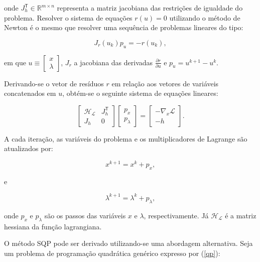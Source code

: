 \documentclass[
	12pt,				%
	openany,			%
	twoside,			%
	a4paper,			%
	chapter=TITLE,		%
	section=Title,		%
	subsection=Title,	%
	subsubsection=Title,%
	english,			%
	french,				%
	spanish,			%
	brazil			%
	]{abntex2}
\begin{document}
\begin{ERRATA}
\noindent onde $J_h^\mathsf{T} \in \mathbb{R}^{m \times n}$ representa a matriz jacobiana das restrições de igualdade do problema. Resolver o sistema de equações $r(u) = 0$ utilizando o método de Newton é o mesmo que resolver uma sequência de problemas lineares do tipo:

\begin{equation}
J_r(u_k)p_u = - r(u_k),
\end{equation}

\noindent em que $u \equiv \begin{bmatrix} x\\ \lambda \end{bmatrix}$, $J_r$ a jacobiana das derivadas $\frac{\partial r}{\partial u}$ e $p_u = u^{k+1}-u^k$.

Derivando-se o vetor de resíduos $r$ em relação aos vetores de variáveis concatenados em $u$, obtém-se o seguinte sistema de equações lineares:

\begin{equation}
\begin{bmatrix}\label{prim}
\mathcal{H_L} & J_h^\mathsf{T} \\
J_h & 0
\end{bmatrix}
\begin{bmatrix}
p_x \\
p_\lambda
\end{bmatrix}
= \begin{bmatrix}
- \nabla_x \mathcal{L} \\
- h
\end{bmatrix}.
\end{equation}

A cada iteração, as variáveis do problema e os multiplicadores de Lagrange são atualizados por:

\begin{equation}
x^{k+1} = x^k + p_x,
\end{equation}

\noindent e


\begin{equation}
\lambda^{k+1} = \lambda^k + p_\lambda,
\end{equation}

\noindent onde $p_x$ e $p_\lambda$ são os passos das variáveis $x$ e $\lambda$, respectivamente. Já $\mathcal{H_L}$ é a matriz hessiana da função lagrangiana. 

O método SQP pode ser derivado utilizando-se uma abordagem alternativa. Seja um problema de programação quadrática genérico expresso por (\ref{qp}):



\end{ERRATA}
\end{document}
